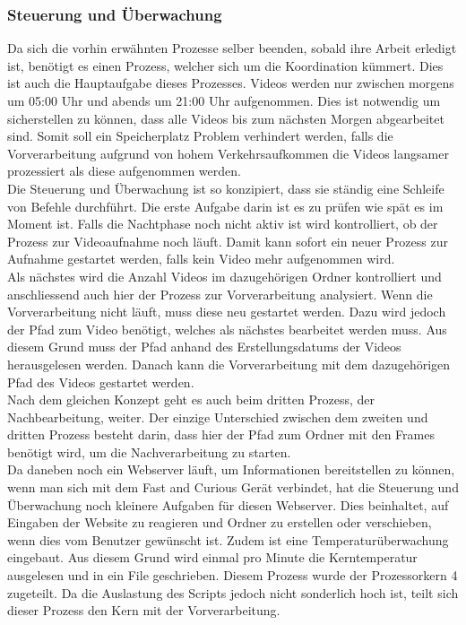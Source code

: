 \subsubsection{Steuerung und Überwachung}
Da sich die vorhin erwähnten Prozesse selber beenden, sobald ihre Arbeit erledigt ist, benötigt es einen Prozess, welcher sich um die Koordination kümmert. Dies ist auch die Hauptaufgabe dieses Prozesses. Videos werden nur zwischen morgens um 05:00 Uhr und abends um 21:00 Uhr aufgenommen. Dies ist notwendig um sicherstellen zu können, dass alle Videos bis zum nächsten Morgen abgearbeitet sind. Somit soll ein Speicherplatz Problem verhindert werden, falls die Vorverarbeitung aufgrund von hohem Verkehrsaufkommen die Videos langsamer prozessiert als diese aufgenommen werden.\\
Die Steuerung und Überwachung ist so konzipiert, dass sie ständig eine Schleife von Befehle durchführt. Die erste Aufgabe darin ist es zu prüfen wie spät es im Moment ist. Falls die Nachtphase noch nicht aktiv ist wird kontrolliert, ob der Prozess zur Videoaufnahme noch läuft. Damit kann sofort ein neuer Prozess zur Aufnahme gestartet werden, falls kein Video mehr aufgenommen wird.\\
Als nächstes wird die Anzahl Videos im dazugehörigen Ordner kontrolliert und anschliessend auch hier der Prozess zur Vorverarbeitung analysiert. Wenn die Vorverarbeitung nicht läuft, muss diese neu gestartet werden. Dazu wird jedoch der Pfad zum Video benötigt, welches als nächstes bearbeitet werden muss. Aus diesem Grund muss der Pfad anhand des Erstellungsdatums der Videos herausgelesen werden. Danach kann die Vorverarbeitung mit dem dazugehörigen Pfad des Videos gestartet werden.\\
Nach dem gleichen Konzept geht es auch beim dritten Prozess, der Nachbearbeitung, weiter. Der einzige Unterschied zwischen dem zweiten und dritten Prozess besteht darin, dass hier der Pfad zum Ordner mit den Frames benötigt wird, um die Nachverarbeitung zu starten.\\
Da daneben noch ein Webserver läuft, um Informationen bereitstellen zu können, wenn man sich mit dem Fast and Curious Gerät verbindet, hat die Steuerung und Überwachung noch kleinere Aufgaben für diesen Webserver. Dies beinhaltet, auf Eingaben der Website zu reagieren und Ordner zu erstellen oder verschieben, wenn dies vom Benutzer gewünscht ist. Zudem ist eine Temperaturüberwachung eingebaut. Aus diesem Grund wird einmal pro Minute die Kerntemperatur ausgelesen und in ein File geschrieben. Diesem Prozess wurde der Prozessorkern 4 zugeteilt. Da die Auslastung des Scripts jedoch nicht sonderlich hoch ist, teilt sich dieser Prozess den Kern mit der Vorverarbeitung. \cite{Bash}